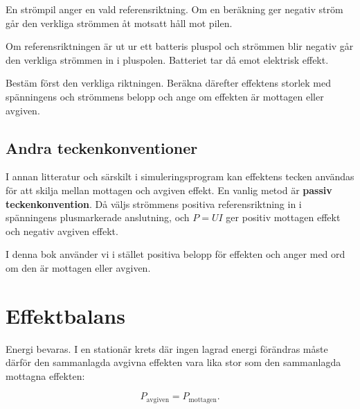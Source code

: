 \documentclass[
  swedish,
  11pt,
  a4paper,
  DIV=11,
  numbers=noendperiod,
  twoside,
  open=any]{scrreprt}
\begin{document}
\begin{tcolorbox}[enhanced jigsaw, arc=.35mm, bottomrule=.15mm, bottomtitle=1mm, breakable, colback=white, colbacktitle=quarto-callout-important-color!10!white, colframe=quarto-callout-important-color-frame, coltitle=black, left=2mm, leftrule=.75mm, opacityback=0, opacitybacktitle=0.6, rightrule=.15mm, title=\textcolor{quarto-callout-important-color}{\faExclamation}\hspace{0.5em}{En negativ ström visar motsatt riktning}, titlerule=0mm, toprule=.15mm, toptitle=1mm]

En strömpil anger en vald referensriktning. Om en beräkning ger negativ
ström går den verkliga strömmen åt motsatt håll mot pilen.

Om referensriktningen är ut ur ett batteris pluspol och strömmen blir
negativ går den verkliga strömmen in i pluspolen. Batteriet tar då emot
elektrisk effekt.

Bestäm först den verkliga riktningen. Beräkna därefter effektens storlek
med spänningens och strömmens belopp och ange om effekten är mottagen
eller avgiven.

\end{tcolorbox}

\subsection{Andra
teckenkonventioner}\label{sec-effekt-passiv-teckenkonvention}

I annan litteratur och särskilt i simuleringsprogram kan effektens
tecken användas för att skilja mellan mottagen och avgiven effekt. En
vanlig metod är \textbf{passiv teckenkonvention}. Då väljs strömmens
positiva referensriktning in i spänningens plusmarkerade anslutning, och
\(P = UI\) ger positiv mottagen effekt och negativ avgiven effekt.

I denna bok använder vi i stället positiva belopp för effekten och anger
med ord om den är mottagen eller avgiven.

\section{Effektbalans}\label{sec-effekt-effektbalans}

Energi bevaras. I en stationär krets där ingen lagrad energi förändras
måste därför den sammanlagda avgivna effekten vara lika stor som den
sammanlagda mottagna effekten:

\[
\boxed{P_\mathrm{avgiven} = P_\mathrm{mottagen}}.
\]
\end{document}
